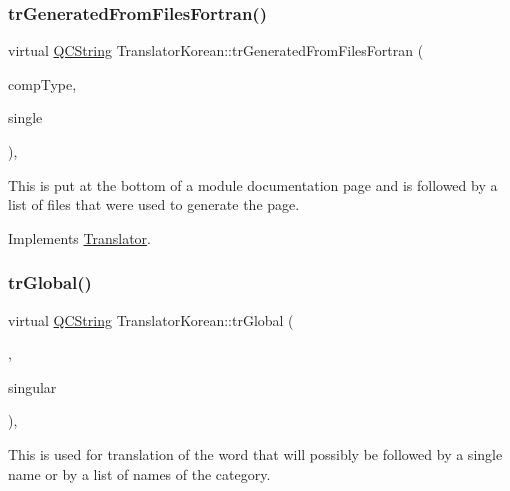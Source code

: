 \mbox{\label{class_translator_korean_a9fe58e5e96a6f39f6c2b702c4998b5da}} 
\subsubsection{\texorpdfstring{trGeneratedFromFilesFortran()}{trGeneratedFromFilesFortran()}}
{\footnotesize\ttfamily virtual \mbox{\hyperlink{class_q_c_string}{Q\+C\+String}} Translator\+Korean\+::tr\+Generated\+From\+Files\+Fortran (\begin{DoxyParamCaption}\item[{\mbox{\hyperlink{class_class_def_ae70cf86d35fe954a94c566fbcfc87939}{Class\+Def\+::\+Compound\+Type}}}]{comp\+Type,  }\item[{bool}]{single }\end{DoxyParamCaption})\hspace{0.3cm}{\ttfamily [inline]}, {\ttfamily [virtual]}}

This is put at the bottom of a module documentation page and is followed by a list of files that were used to generate the page. 

Implements \mbox{\hyperlink{class_translator}{Translator}}.

\mbox{\label{class_translator_korean_a825ad7820d84629c6c64aeaceb38ac88}} 
\subsubsection{\texorpdfstring{trGlobal()}{trGlobal()}}
{\footnotesize\ttfamily virtual \mbox{\hyperlink{class_q_c_string}{Q\+C\+String}} Translator\+Korean\+::tr\+Global (\begin{DoxyParamCaption}\item[{bool}]{,  }\item[{bool}]{singular }\end{DoxyParamCaption})\hspace{0.3cm}{\ttfamily [inline]}, {\ttfamily [virtual]}}

This is used for translation of the word that will possibly be followed by a single name or by a list of names of the category. 

